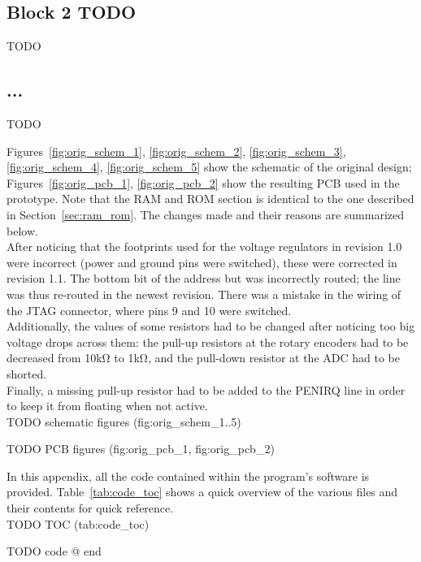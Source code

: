 \documentclass[titlepage]{scrartcl}
\begin{document}
	\subsection{Block 2 TODO}
	TODO

	\subsection{...}
	TODO


	Figures~\ref{fig:orig_schem_1}, \ref{fig:orig_schem_2}, \ref{fig:orig_schem_3}, \ref{fig:orig_schem_4}, \ref{fig:orig_schem_5} show the schematic of the original design; Figures~\ref{fig:orig_pcb_1}, \ref{fig:orig_pcb_2} show the resulting PCB used in the prototype. Note that the RAM and ROM section is identical to the one described in Section~\ref{sec:ram_rom}. The changes made and their reasons are summarized below.\\

	After noticing that the footprints used for the voltage regulators in revision 1.0 were incorrect (power and ground pins were switched), these were corrected in revision 1.1. The bottom bit of the address but was incorrectly routed; the line was thus re-routed in the newest revision. There was a mistake in the wiring of the JTAG connector, where pins 9 and 10 were switched.\\

	Additionally, the values of some resistors had to be changed after noticing too big voltage drops across them: the pull-up resistors at the rotary encoders had to be decreased from 10kΩ to 1kΩ, and the pull-down resistor at the ADC had to be shorted.\\

	Finally, a missing pull-up resistor had to be added to the PENIRQ line in order to keep it from floating when not active.\\

	TODO schematic figures (fig:orig\_schem\_1..5)

	TODO PCB figures (fig:orig\_pcb\_1, fig:orig\_pcb\_2)

	In this appendix, all the code contained within the program's software is provided. Table~\ref{tab:code_toc} shows a quick overview of the various files and their contents for quick reference.\\

	TODO TOC (tab:code\_toc)

	TODO code @ end
	
	
\end{document}
